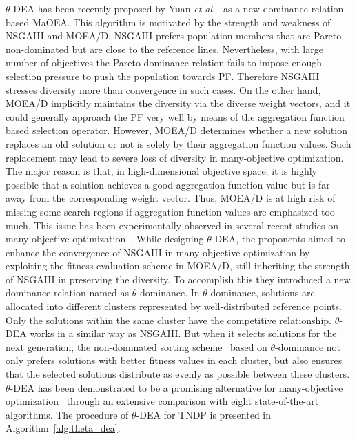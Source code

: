 $\theta$-DEA has been recently proposed by Yuan \textit{et al.}~\cite{yuan2016new} as a new dominance relation based MaOEA. This algorithm is motivated by the strength and weakness of NSGAIII and MOEA/D. NSGAIII prefers population members that are Pareto non-dominated but are close to the reference lines. Nevertheless, with large number of objectives the Pareto-dominance relation fails to impose enough selection pressure to push the population towards PF. Therefore NSGAIII stresses diversity more than convergence in such cases. On the other hand, MOEA/D implicitly maintains the diversity via the diverse weight vectors, and it could generally approach the PF very well by means of the aggregation function based selection operator. However, MOEA/D determines whether a new solution replaces an old solution or not is solely by their aggregation function values. Such replacement may lead to severe loss of diversity in many-objective optimization. The major reason is that, in high-dimensional objective space, it is highly possible that a solution achieves a good aggregation function value but is far away from the corresponding weight vector. Thus, MOEA/D is at high risk of missing some search regions if aggregation function values are emphasized too much. This issue has been experimentally observed in several recent studies on many-objective optimization~\cite{ deb2014evolutionary, li2013comparative}. While designing $\theta$-DEA, the proponents aimed to enhance the convergence of NSGAIII in many-objective optimization by exploiting the fitness evaluation scheme in MOEA/D, still inheriting the strength of NSGAIII in preserving the diversity. To accomplish this they introduced a new dominance relation named as $\theta$-dominance. In $\theta$-dominance, solutions are allocated into different clusters represented by well-distributed reference points. Only the solutions within the same cluster have the competitive relationship.  $\theta$-DEA works in a similar way as NSGAIII. But when it selects solutions for the next generation, the non-dominated sorting scheme~\cite{golberg1989genetic} based on $\theta$-dominance not only prefers solutions with better fitness values in each cluster, but also ensures that the selected solutions distribute as evenly as possible between these clusters. $\theta$-DEA has been demonstrated to be a promising alternative for many-objective optimization~\cite{yuan2016new} through an extensive comparison with eight state-of-the-art algorithms. The procedure of $\theta$-DEA for TNDP is presented in Algorithm~\ref{alg:theta_dea}.

